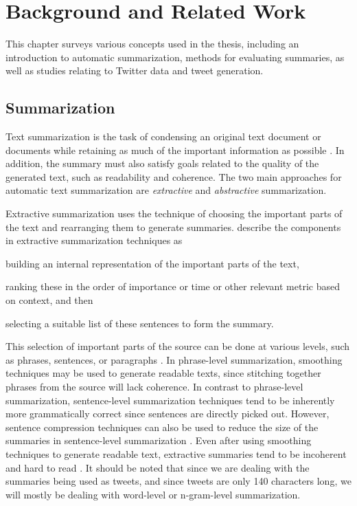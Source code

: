 \chapter{Background and Related Work}
\label{chap:background}

This chapter surveys various concepts used in the thesis, including an introduction to automatic summarization, methods for evaluating summaries, as well as studies relating to Twitter data and tweet generation.


\section{Summarization}

Text summarization is the task of condensing an original text document or documents while retaining as much of the important information as possible \citep{mani-2001}. In addition, the summary must also satisfy goals related to the quality of the generated text, such as readability and coherence. The two main approaches for automatic text summarization are \textit{extractive} and \textit{abstractive} summarization. 

Extractive summarization uses the technique of choosing the important parts of the text and rearranging them to generate summaries. \cite{nenkova2012survey} describe the components in extractive summarization techniques as 
\begin{inparaenum}[1)]
\item{building an internal representation of the important parts of the text,}
\item{ranking these in the order of importance or time or other relevant metric based on context, and then }
\item{selecting a suitable list of these sentences to form the summary.}
\end{inparaenum}

 This selection of important parts of the source can be done at various levels, such as phrases, sentences, or paragraphs \citep{nenkova2012survey, hahn2000challenges}. In phrase-level summarization, smoothing techniques may be used to generate readable texts, since stitching together phrases from the source will lack coherence. In contrast to phrase-level summarization, sentence-level summarization techniques tend to be inherently more grammatically correct since sentences are directly picked out. However, sentence compression techniques can also be used to reduce the size of the summaries in sentence-level summarization \citep{knight2002summarization}. Even after using smoothing techniques to generate readable text, extractive summaries tend to be incoherent and hard to read \citep{liu2009extractive}. It should be noted that since we are dealing with the summaries being used as tweets, and since tweets are only 140 characters long, we will mostly be dealing with word-level or n-gram-level summarization. 


